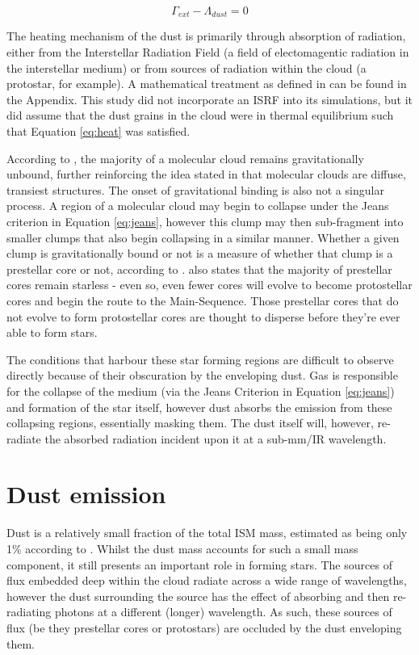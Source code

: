 \documentclass{report}
\begin{document}
\begin{equation}
  \Gamma_{ext} - \Lambda_{dust} = 0
  \label{eq:heat}
\end{equation}

The heating mechanism of the dust is primarily through absorption of radiation, either from the Interstellar Radiation Field (a field of electomagentic radiation in the interstellar medium) or from sources of radiation within the cloud (a protostar, for example). A mathematical treatment as defined in \textcite{treecol} can be found in the Appendix. This study did not incorporate an ISRF into its simulations, but it did assume that the dust grains in the cloud were in thermal equilibrium such that Equation \ref{eq:heat} was satisfied.

According to \textcite{bound}, the majority of a molecular cloud remains gravitationally unbound, further reinforcing the idea stated in \textcite{evo-mol} that molecular clouds are diffuse, transiest structures. The onset of gravitational binding is also not a singular process. A region of a molecular cloud may begin to collapse under the Jeans criterion in Equation \ref{eq:jeans}, however this clump may then sub-fragment into smaller clumps that also begin collapsing in a similar manner. Whether a given clump is gravitationally bound or not is a measure of whether that clump is a prestellar core or not, according to \textcite{prestellar}. \textcite{prestellar} also states that the majority of prestellar cores remain starless - even so, even fewer cores will evolve to become protostellar cores and begin the route to the Main-Sequence. Those prestellar cores that do not evolve to form protostellar cores are thought to disperse before they're ever able to form stars.

The conditions that harbour these star forming regions are difficult to observe directly because of their obscuration by the enveloping dust. Gas is responsible for the collapse of the medium (via the Jeans Criterion in Equation \ref{eq:jeans}) and formation of the star itself, however dust absorbs the emission from these collapsing regions, essentially masking them. The dust itself will, however, re-radiate the absorbed radiation incident upon it at a sub-mm/IR wavelength.

\section{Dust emission}
Dust is a relatively small fraction of the total ISM mass, estimated as being only 1\% according to \textcite{noise}. Whilst the dust mass accounts for such a small mass component, it still presents an important role in forming stars. The sources of flux embedded deep within the cloud radiate across a wide range of wavelengths, however the dust surrounding the source has the effect of absorbing and then re-radiating photons at a different (longer) wavelength. As such, these sources of flux (be they prestellar cores or protostars) are occluded by the dust enveloping them.
\end{document}
